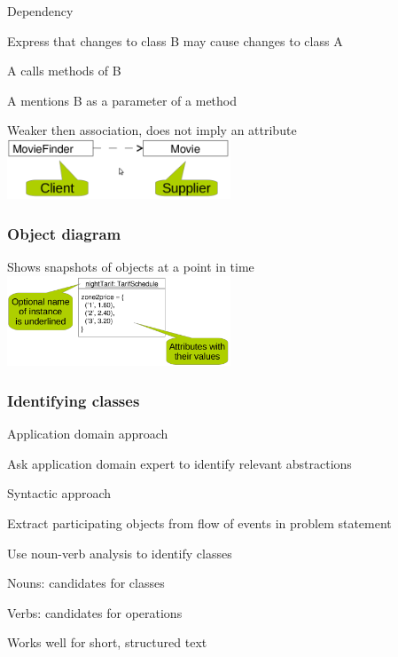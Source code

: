 \documentclass[10pt]{article}
\begin{document}
	\item Dependency
	\enumstart
		\item Express that changes to class B may cause changes to class A
		\enumstart
			\item A calls methods of B
			\item A mentions B as a parameter of a method
		\enumend
		\item Weaker then association, does not imply an attribute
	\enumend
	\includegraphics[width=0.5\textwidth]{dependency.png}
\enumend

\subsubsection{Object diagram}
\enumstart
	\item Shows snapshots of objects at a point in time
	\\ \includegraphics[width=0.5\textwidth]{object_diagram.png}
\enumend

\subsubsection{Identifying classes}
\enumstart
	\item Application domain approach
	\enumstart
		\item Ask application domain expert to identify relevant abstractions
	\enumend

	\item Syntactic approach
	\enumstart
		\item Extract participating objects from flow of events in problem statement
		\item Use noun-verb analysis to identify classes
		\enumstart
			\item Nouns: candidates for classes
			\item Verbs: candidates for operations
			\item Works well for short, structured text
		\enumend
	\enumend
\end{document}
